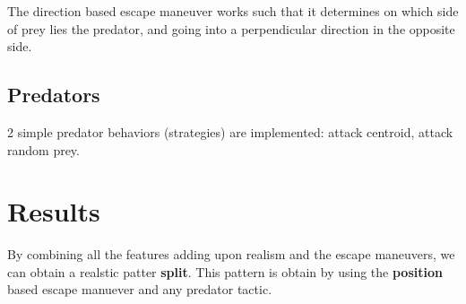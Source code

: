 \documentclass[9pt]{pnas-new}
\begin{document}
The direction based escape maneuver works such that it determines on which side of prey lies the predator, and going into a perpendicular direction in the opposite side.

\subsection*{Predators}

2 simple predator behaviors (strategies) are implemented: attack centroid, attack random prey.

\section*{Results}

By combining all the features adding upon realism and the escape maneuvers, we can obtain a realstic patter \textbf{split}.
This pattern is obtain by using the \textbf{position} based escape manuever and any predator tactic.
\end{document}
